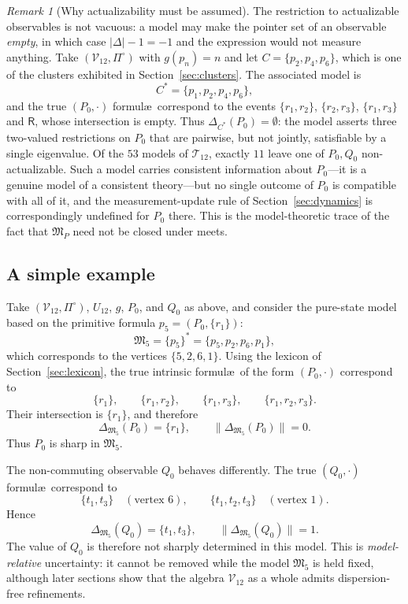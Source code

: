 \documentclass{article}   	%
\theoremstyle{plain}
\theoremstyle{definition}
\theoremstyle{remark}
\newtheorem{remark}[theorem]{Remark}
\begin{document}
\begin{remark}[Why actualizability must be assumed]
\label{rem:empty-pointer}
The restriction to actualizable observables is not vacuous: a model may make
the pointer set of an observable \emph{empty}, in which case $|\Delta|-1=-1$
and the expression would not measure anything.  Take
$(\mathcal V_{12},\Pi^\circ)$ with $g(p_n)=n$ and let
$C=\{p_2,p_4,p_6\}$, which is one of the clusters exhibited in
Section~\ref{sec:clusters}.  The associated model is
\[
C^*=\{p_1,p_2,p_4,p_6\},
\]
and the true $(P_0,\cdot)$ formul\ae\ correspond to the events
$\{r_1,r_2\}$, $\{r_2,r_3\}$, $\{r_1,r_3\}$ and $\mathsf R$, whose
intersection is empty.  Thus $\Delta_{C^*}(P_0)=\emptyset$: the model asserts
three two-valued restrictions on $P_0$ that are pairwise, but not jointly,
satisfiable by a single eigenvalue.  Of the $53$ models of $\mathcal T_{12}$,
exactly $11$ leave one of $P_0,Q_0$ non-actualizable.  Such a model carries
consistent information about $P_0$---it is a genuine model of a consistent
theory---but no single outcome of $P_0$ is compatible with all of it, and the
measurement-update rule of Section~\ref{sec:dynamics} is correspondingly
undefined for $P_0$ there.  This is the model-theoretic trace of the fact that
$\mathfrak M_P$ need not be closed under meets.
\end{remark}

\subsection{A simple example}
\label{subsec:simpleunc}

Take $(\mathcal V_{12},\Pi^\circ)$, $U_{12}$, $g$, $P_0$, and $Q_0$ as above,
and consider the pure-state model based on the primitive formula
$p_5=(P_0,\{r_1\})$:
\[
\mathfrak M_5=\{p_5\}^*=\{p_5,p_2,p_6,p_1\},
\]
which corresponds to the vertices $\{5,2,6,1\}$.
Using the lexicon of Section~\ref{sec:lexicon}, the true intrinsic formul\ae\
of the form $(P_0,\cdot)$ correspond to
\[
\{r_1\},\qquad \{r_1,r_2\},\qquad \{r_1,r_3\},\qquad
\{r_1,r_2,r_3\}.
\]
Their intersection is $\{r_1\}$, and therefore
\[
\Delta_{\mathfrak M_5}(P_0)=\{r_1\},
\qquad
\|\Delta_{\mathfrak M_5}(P_0)\|=0.
\]
Thus $P_0$ is sharp in $\mathfrak M_5$.

The non-commuting observable $Q_0$ behaves differently.  The true
$(Q_0,\cdot)$ formul\ae\ correspond to
\[
\{t_1,t_3\}\quad(\text{vertex }6),
\qquad
\{t_1,t_2,t_3\}\quad(\text{vertex }1).
\]
Hence
\[
\Delta_{\mathfrak M_5}(Q_0)=\{t_1,t_3\},
\qquad
\|\Delta_{\mathfrak M_5}(Q_0)\|=1.
\]
The value of $Q_0$ is therefore not sharply determined in this model.  This is
\emph{model-relative} uncertainty: it cannot be removed while the model
$\mathfrak M_5$ is held fixed, although later sections show that the algebra
$\mathcal V_{12}$ as a whole admits dispersion-free refinements.
\end{document}
